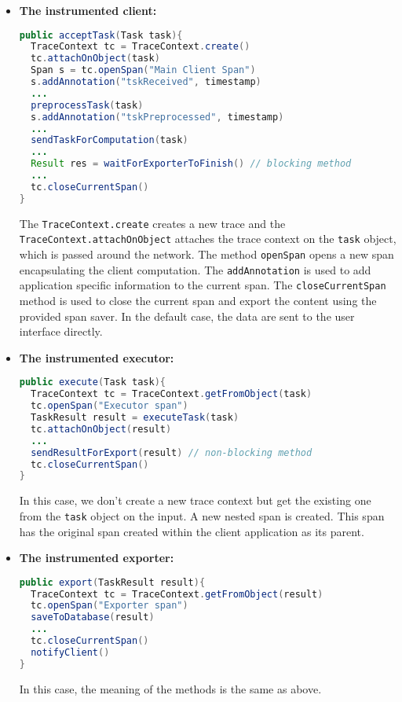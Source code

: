 \begin{itemize}
\item \textbf{The instrumented client:}
\begin{lstlisting}[language=Java]
public acceptTask(Task task){
  TraceContext tc = TraceContext.create()
  tc.attachOnObject(task)
  Span s = tc.openSpan("Main Client Span")	
  s.addAnnotation("tskReceived", timestamp)
  ...
  preprocessTask(task)
  s.addAnnotation("tskPreprocessed", timestamp)
  ...
  sendTaskForComputation(task)
  ...
  Result res = waitForExporterToFinish() // blocking method
  ...
  tc.closeCurrentSpan()
}
\end{lstlisting}
The \texttt{TraceContext.create} creates a new trace and the \texttt{TraceContext.attachOnObject} attaches the trace context on the \texttt{task} object, which is passed around the network. The method \texttt{openSpan} opens a new span encapsulating the client computation. The \texttt{addAnnotation} is used to add application specific information to the current span. The \texttt{closeCurrentSpan} method is used to close the current span and export the content using the provided span saver. In the default case, the data are sent to the user interface directly.


\item \textbf{The instrumented executor:}
\begin{lstlisting}[language=Java]
public execute(Task task){
  TraceContext tc = TraceContext.getFromObject(task)
  tc.openSpan("Executor span")
  TaskResult result = executeTask(task)
  tc.attachOnObject(result)
  ...
  sendResultForExport(result) // non-blocking method
  tc.closeCurrentSpan()
}
\end{lstlisting}
In this case, we don't create a new trace context but get the existing one from the \texttt{task} object on the input. A new nested span is created. This span has the original span created within the client application as its parent.

\item \textbf{The instrumented exporter:}
\begin{lstlisting}[language=Java]
public export(TaskResult result){
  TraceContext tc = TraceContext.getFromObject(result)
  tc.openSpan("Exporter span")
  saveToDatabase(result)
  ...
  tc.closeCurrentSpan()
  notifyClient()	
}
\end{lstlisting}
In this case, the meaning of the methods is the same as above.

\end{itemize}

